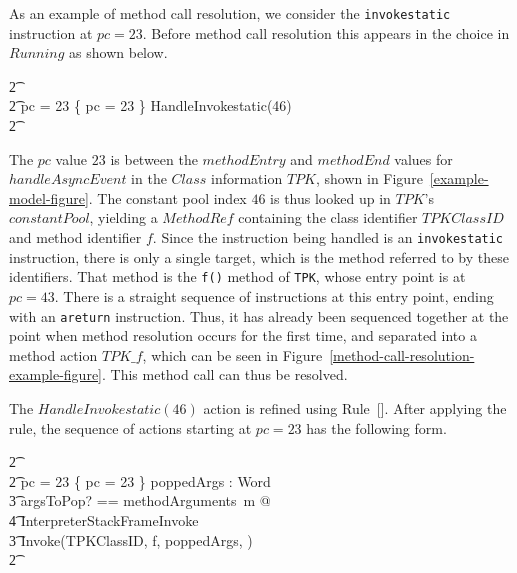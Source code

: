 As an example of method call resolution, we consider the
\texttt{invokestatic} instruction at $pc = 23$. 
Before method call resolution this appears in the choice in $Running$
as shown below.
\begin{circusaction}
  \t2 {} \cdots {} \\
  \t2 {} \circelse pc = 23 \circthen \{ pc = 23 \} HandleInvokestatic(46) \\
  \t2 {} \cdots {} \\
\end{circusaction}
The $pc$ value $23$ is between the $methodEntry$ and $methodEnd$
values for $handleAsyncEvent$ in the $Class$ information $TPK$, shown
in Figure~\ref{example-model-figure}.
The constant pool index $46$ is thus looked up in $TPK$'s
$constantPool$, yielding a $MethodRef$ containing the class identifier
$TPKClassID$ and method identifier $f$.
Since the instruction being handled is an \texttt{invokestatic}
instruction, there is only a single target, which is the method
referred to by these identifiers.
That method is the \texttt{f()} method of \texttt{TPK}, whose entry
point is at $pc = 43$.
There is a straight sequence of instructions at this entry point,
ending with an \texttt{areturn} instruction. 
Thus, it has already been sequenced together at the point when method
resolution occurs for the first time, and separated into a method
action $TPK\_f$, which can be seen in
Figure~\ref{method-call-resolution-example-figure}.
This method call can thus be resolved.

The $HandleInvokestatic(46)$ action is refined using
Rule~[].
After applying the rule, the sequence of actions starting at $pc = 23$
has the following form.
\begin{circusaction}
  \t2 {} \cdots {} \\
  \t2 {} \circelse pc = 23 \circthen \{ pc = 23 \} \circseq \circvar poppedArgs : \seq Word \circspot \\
  \t3 \lschexpract \exists argsToPop? == methodArguments~m @ \\
  \t4 InterpreterStackFrameInvoke \rschexpract \circseq \\
  \t3 Invoke(TPKClassID, f, poppedArgs, \true) \\
  \t2 {} \cdots {}
\end{circusaction}

